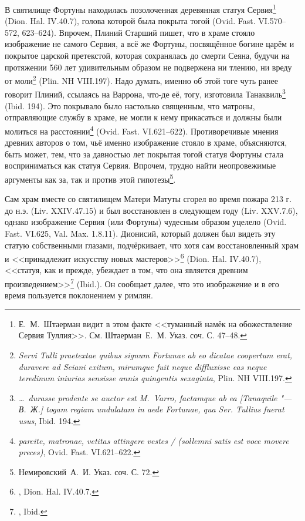 В святилище Фортуны находилась позолоченная деревянная статуя Сервия\footnote{Е.~М.~Штаерман видит в этом факте <<туманный намёк на обожествление Сервия Туллия>>. См. Штаерман~Е.~М. Указ. соч. С. 47--48.} (Dion. Hal. IV.40.7), голова которой была покрыта тогой (Ovid. Fast. VI.570--572, 623--624). Впрочем, Плиний Старший пишет, что в храме стояло изображение не самого Сервия, а всё же Фортуны, посвящённое богине царём и покрытое царской претекстой, которая сохранялась до смерти Сеяна, будучи на протяжении 560 лет удивительным образом не подвержена ни тлению, ни вреду от моли\footnote{\textit{Servi Tulli praetextae quibus signum Fortunae ab eo dicatae coopertum erat, duravere ad Seiani exitum, mirumque fuit neque diffluxisse eas neque teredinum iniurias sensisse annis quingentis sexaginta}, Plin. NH VIII.197.} (Plin. NH VIII.197). Надо думать, именно об этой тоге чуть ранее говорит Плиний, ссылаясь на Варрона, что-де её, тогу, изготовила Танаквиль\footnote{\textit{\ldots{}~durasse prodente se auctor est M.~Varro, factamque ab ea [Tanaquile "--- В.~Ж.] togam regiam undulatam in aede Fortunae, qua Ser. Tullius fuerat usus}, Ibid. 194.} (Ibid. 194). Это покрывало было настолько священным, что матроны, отправляющие службу в храме, не могли к нему прикасаться и должны были молиться на расстоянии\footnote{\textit{parcite, matronae, vetitas attingere vestes / (sollemni satis est voce movere preces)}, Ovid. Fast. VI.621--622.} (Ovid. Fast. VI.621--622). Противоречивые мнения древних авторов о том, чьё именно изображение стояло в храме, объясняются, быть может, тем, что за давностью лет покрытая тогой статуя Фортуны стала восприниматься как статуя Сервия. Впрочем, трудно найти неопровежимые аргументы как за, так и против этой гипотезы\footnote{Немировский~А.~И. Указ. соч. С. 72.}.

Сам храм вместе со святилищем Матери Матуты сгорел во время пожара 213 г. до н.э. (Liv. XXIV.47.15) и был восстановлен в следующем году (Liv. XXV.7.6), однако изображение Сервия (или Фортуны) чудесным образом уцелело (Ovid. Fast. VI.625, Val. Max. 1.8.11). Дионисий, который должен был видеть эту статую собственными глазами, подчёркивает, что хотя сам восстановленный храм и <<принадлежит искусству новых мастеров>>\footnote{, Dion. Hal. IV.40.7.} (Dion. Hal. IV.40.7), <<статуя, как и прежде, убеждает в том, что она является древним произведением>>\footnote{, Ibid.} (Ibid.). Он сообщает далее, что это изображение и в его время пользуется поклонением у римлян.


